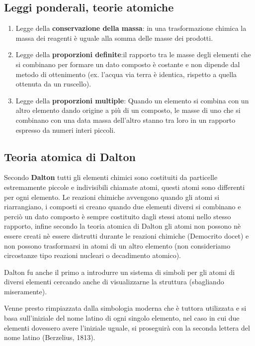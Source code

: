 \subsection{Leggi ponderali, teorie atomiche}
\begin{enumerate}
    \item Legge della \textbf{conservazione della massa}: in una trasformazione chimica la massa dei reagenti è uguale alla somma delle masse dei prodotti.
    \item Legge della \textbf{proporzioni definite}:il rapporto tra le masse degli elementi che si combinano per formare un dato composto è costante e non dipende dal metodo di ottenimento (ex. l'acqua via terra è identica, rispetto a quella ottenuta da un ruscello).
    \item Legge della \textbf{proporzioni multiple}: Quando un elemento si combina con un altro elemento dando origine a più di un composto, le masse di uno che si combinano con una data massa dell’altro stanno tra loro in un rapporto espresso da numeri interi piccoli.
\end{enumerate}

\subsection{Teoria atomica di Dalton}
Secondo \textbf{Dalton} tutti gli elementi chimici sono costituiti da particelle estremamente piccole e indivisibili chiamate atomi, questi atomi sono differenti per ogni elemento. Le reazioni chimiche avvengono quando gli atomi si riarrangiano, i composti si creano quando due elementi diversi si combinano e perciò un dato composto è sempre costituito dagli stessi atomi nello stesso rapporto, infine secondo la teoria atomica di Dalton gli atomi non possono nè essere creati nè essere distrutti durante le reazioni chimiche (Democrito docet) e non possono trasformarsi in atomi di un altro elemento (non consideriamo circostanze tipo reazioni nucleari o decadimento atomico).

Dalton fu anche il primo a introdurre un sistema di simboli per gli atomi di diversi elementi cercando anche di visualizzarne la struttura (sbagliando miseramente).

Venne presto rimpiazzata dalla simbologia moderna che è tuttora utilizzata e si basa sull'iniziale del nome latino di ogni singolo elemento, nel caso in cui due elementi dovessero avere l'iniziale uguale, si proseguirà con la seconda lettera del nome latino (Berzelius, 1813).

